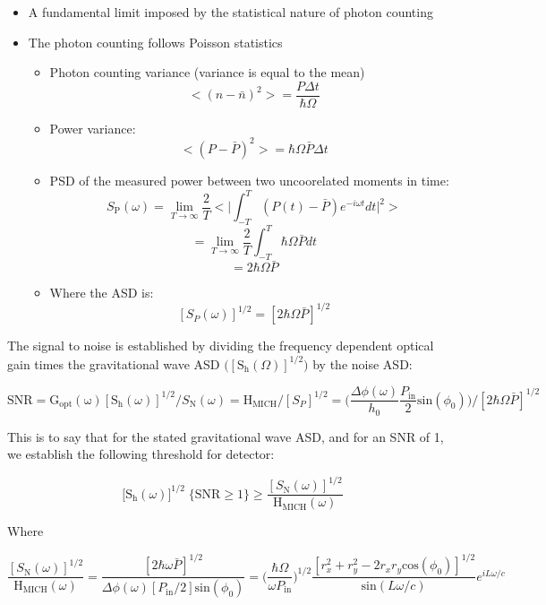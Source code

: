 \documentclass[11pt]{article}
\providecommand{\tightlist}{%
      \setlength{\itemsep}{0pt}\setlength{\parskip}{0pt}}
\begin{document}
\begin{itemize}
\tightlist
\item
  A fundamental limit imposed by the statistical nature of photon
  counting
\item
  The photon counting follows Poisson statistics

  \begin{itemize}
  \tightlist
  \item
    Photon counting variance (variance is equal to the mean)
    \[ < (n-\bar{n})^2 >  = \frac{P \Delta t}{ \hbar \Omega} \]
  \item
    Power variance:
    \[ < (P - \bar{P})^2 >  = \hbar \Omega  \bar{P} \Delta t \]
  \item
    PSD of the measured power between two uncoorelated moments in time:
    \[ S_\mathrm{P} (\omega) = \lim_{T \to \infty} \frac{2}{T} \Big< \big| \int_{-T}^{T} (P(t) - \bar{P}) e^{-i\omega t} dt \big|^2 \Big> \]
    \[ =  \lim_{T \to \infty} \frac{2}{T} \int_{-T}^{T} \hbar \Omega \bar{P} dt  \]
    \[ = 2 \hbar \Omega \bar{P} \]
  \item
    Where the ASD is:
    \[ [S_P (\omega)]^{1/2} = [2 \hbar \Omega \bar{P}]^{1/2}\]
  \end{itemize}
\end{itemize}

    The signal to noise is established by dividing the frequency dependent
optical gain times the gravitational wave ASD
\(\big( [\mathrm{S}_{\mathrm{h}}(\Omega)]^{1/2} \big)\) by the noise
ASD:

\[\mathrm{SNR} = \mathrm{G_{opt}(\omega)} [\mathrm{S}_{\mathrm{h}}(\omega)]^{1/2} / S_\mathrm{N}(\omega) = \mathrm{H}_\mathrm{MICH} / [S_P]^{1/2} = \bigg( \frac{\Delta \phi(\omega)}{h_0} \frac{P_\mathrm{in}}{2}\mathrm{sin}(\phi_0) \bigg) \bigg/ [2 \hbar \Omega \bar{P}]^{1/2}\]

This is to say that for the stated gravitational wave ASD, and for an
SNR of 1, we establish the following threshold for detector:

\[\big[ \mathrm{S}_{\mathrm{h}}(\omega) \big]^{1/2} \; \{\mathrm{SNR}\geq1\} \geq \frac{ [S_\mathrm{N}(\omega)]^{1/2}}{\mathrm{H}_\mathrm{MICH}(\omega)}\]

Where

\[\frac{ [S_\mathrm{N}(\omega)]^{1/2}}{\mathrm{H}_\mathrm{MICH}(\omega)} = \frac{[2 \hbar \omega \bar{P}]^{1/2}}{ \Delta \phi(\omega) [P_\mathrm{in} / 2]  \mathrm{sin}(\phi_0)} = \bigg( \frac{\hbar \Omega }{\omega P_\mathrm{in}} \bigg)^{1/2} \frac{[r_x^2 + r_y^2 -  2r_x r_y\mathrm{cos}(\phi_0)]^{1/2}}{\mathrm{sin}(L \omega / c)} e^{iL \omega / c}\]
\end{document}
